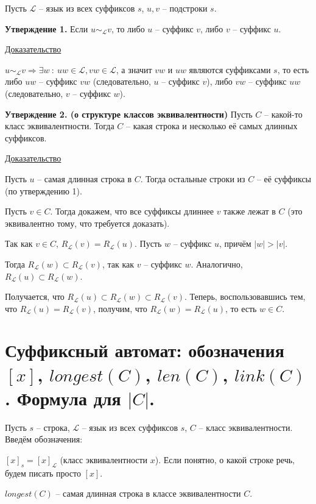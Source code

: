 Пусть $\mathcal{L}$ -- язык из всех суффиксов $s$, $u, v$ -- подстроки $s$.

\textbf{Утверждение 1.} Если $u \sim_{\mathcal{L}} v$, то либо $u$ -- суффикс $v$, либо $v$ -- суффикс $u$.

\underline{Доказательство}

$
    u \sim_{\mathcal{L}} v \Rightarrow \exists w\ :\ uw \in \mathcal{L},
    vw \in \mathcal{L}
$, а значит $vw$ и $uw$ являются суффиксами $s$, то есть либо
$uw$ -- суффикс $vw$ (следовательно, $u$ -- суффикс $v$), либо
$vw$ -- суффикс $uw$ (следовательно, $v$ -- суффикс $w$).

\textbf{Утверждение 2. (о структуре классов эквивалентности)} Пусть $C$ -- какой-то класс эквивалентности. Тогда $C$ -- какая строка и несколько её самых длинных суффиксов.

\underline{Доказательство}

Пусть $u$ -- самая длинная строка в $C$. Тогда остальные строки из $C$ -- её суффиксы (по утверждению 1).

Пусть $v \in C$. Тогда докажем, что все суффиксы длиннее $v$ также лежат в $C$ (это эквивалентно тому, что требуется доказать).

Так как $v \in C$, $R_{\mathcal{L}}(v) = R_{\mathcal{L}}(u)$. Пусть $w$ -- суффикс $u$, причём $|w| > |v|$.

Тогда $R_{\mathcal{L}}(w) \subset R_{\mathcal{L}}(v)$, так как $v$ -- суффикс $w$. Аналогично, $R_{\mathcal{L}}(u) \subset R_{\mathcal{L}}(w)$.

Получается, что $R_{\mathcal{L}}(u) \subset R_{\mathcal{L}}(w) \subset R_{\mathcal{L}}(v)$. Теперь, воспользовавшись тем, что $R_{\mathcal{L}}(u) = R_{\mathcal{L}}(v)$, получим, что $R_{\mathcal{L}}(w) = R_{\mathcal{L}}(u)$, то есть $w \in C$.

\newpage{}

\section{Суффиксный автомат: обозначения $[x]$, $longest(C)$, $len(C)$, $link(C)$. Формула для $|C|$.}

Пусть $s$ -- строка, $\mathcal{L}$ -- язык из всех суффиксов $s$, $C$ -- класс эквивалентности. Введём обозначения:

$[x]_s = [x]_{\mathcal{L}}$ (класс эквивалентности $x$). Если понятно, о какой строке речь, будем писать просто $[x]$.

$longest(C)$ -- самая длинная строка в классе эквивалентности $C$.

